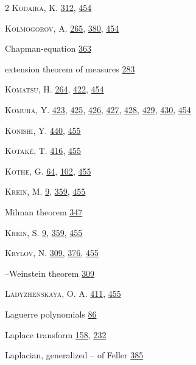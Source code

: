 \begin{multicols}{2}
\noindent \textsc{Kodaira}, K. \hyperlink{page.312}{312}, \hyperlink{page.454}{454}\par
\noindent \textsc{Kolmogorov}, A. \hyperlink{page.265}{265}, \hyperlink{page.380}{380}, \hyperlink{page.454}{454}\par
\hspace*{1.1em}Chapman-equation \hyperlink{page.363}{363}\par
\hspace*{1.1em}extension theorem of measures \hyperlink{page.283}{283}\par
\noindent \textsc{Komatsu}, H. \hyperlink{page.264}{264}, \hyperlink{page.422}{422}, \hyperlink{page.454}{454}\par
\noindent \textsc{Komura}, Y. \hyperlink{page.423}{423}, \hyperlink{page.425}{425}, \hyperlink{page.426}{426}, \hyperlink{page.427}{427}, \hyperlink{page.428}{428}, \hyperlink{page.429}{429}, \hyperlink{page.430}{430}, \hyperlink{page.454}{454}\par
\noindent \textsc{Konishi}, Y. \hyperlink{page.440}{440}, \hyperlink{page.455}{455}\par
\noindent \textsc{Kotaké}, T. \hyperlink{page.416}{416}, \hyperlink{page.455}{455}\par
\noindent \textsc{Köthe}, G. \hyperlink{page.64}{64}, \hyperlink{page.102}{102}, \hyperlink{page.455}{455}\par
\noindent \textsc{Krein}, M. \hyperlink{page.9}{9}, \hyperlink{page.359}{359}, \hyperlink{page.455}{455}\par
\hspace*{1.1em}Milman theorem \hyperlink{page.347}{347}\par
\noindent \textsc{Krein}, S. \hyperlink{page.9}{9}, \hyperlink{page.359}{359}, \hyperlink{page.455}{455}\par
\noindent \textsc{Krylov}, N. \hyperlink{page.309}{309}, \hyperlink{page.376}{376}, \hyperlink{page.455}{455}\par
\hspace*{1.1em}--Weinstein theorem \hyperlink{page.309}{309}\par
\noindent \textsc{Ladyzhenskaya}, O. A. \hyperlink{page.411}{411}, \hyperlink{page.455}{455}\par
\noindent Laguerre polynomials \hyperlink{page.86}{86}\par
\noindent Laplace transform \hyperlink{page.158}{158}, \hyperlink{page.232}{232}\par
\noindent Laplacian, generalized -- of Feller \hyperlink{page.385}{385}\par

\end{multicols}
